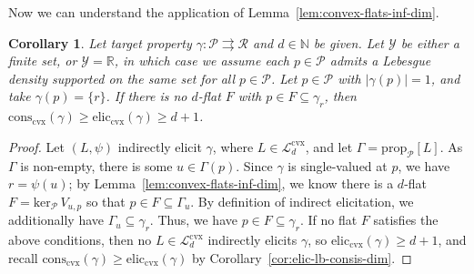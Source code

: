 \documentclass[11pt]{article} %
\newcommand{\Comments}{1}
\newcommand{\mynote}[2]{\ifnum\Comments=1\textcolor{#1}{#2}\fi}
\newcommand{\jessie}[1]{\mynote{purple}{[JF: #1]}}
\newcommand{\reals}{\mathbb{R}}
\newcommand{\simplex}{\Delta_\Y}
\newcommand{\relint}[1]{\mathrm{relint}(#1)}
\newcommand{\prop}[2][\mathcal{P}]{\mathrm{prop}_{#1}[#2]}
\newcommand{\eliccvx}{\mathrm{elic}_\mathrm{cvx}}
\newcommand{\conscvx}{\mathrm{cons}_\mathrm{cvx}}
\newcommand{\range}{\mathrm{range}\,}
\newcommand{\zeros}[1]{\mathrm{ker}_\P\,#1}
\newcommand{\Pcodimension}{$\mathcal{P}$-codimension\,}
\renewcommand{\L}{\mathcal{L}}
\newcommand{\Lcvx}{\mathcal{L}^{\mathrm{cvx}}}
\newcommand{\R}{\mathcal{R}}
\renewcommand{\P}{\mathcal{P}}
\newcommand{\Y}{\mathcal{Y}}
\newcommand{\toto}{\rightrightarrows}
\newtheorem{lemma}{Lemma}
\newtheorem{corollary}{Corollary}
\begin{document}
Now we can understand the application of Lemma~\ref{lem:convex-flats-inf-dim}.

\begin{corollary}\label{cor:Pcodim-flat-single-val-prop}
	Let target property $\gamma:\P \toto \R$ and $d\in\mathbb N$ be given.
	Let $\Y$ be either a finite set, or $\Y = \reals$, in which case we assume each $p\in\P$ admits a Lebesgue density supported on the same set for all $p\in\P$.
	Let $p \in \P$ with $|\gamma(p)| = 1$, and take $\gamma(p) = \{r\}$.
	If there is no $d$-flat $F$ with $p \in F \subseteq \gamma_r$, then $\conscvx(\gamma) \geq \eliccvx(\gamma) \geq d + 1$.%
\end{corollary}
\begin{proof}
	Let $(L, \psi)$ indirectly elicit $\gamma$, where $L\in\Lcvx_d$, and let $\Gamma = \prop{L}$.
	As $\Gamma$ is non-empty, there is some $u \in \Gamma(p)$.
	Since $\gamma$ is single-valued at $p$, we have $r = \psi(u)$; by Lemma~\ref{lem:convex-flats-inf-dim}, we know there is a $d$-flat $F = \zeros{V_{u,p}}$ so that $p \in F \subseteq \Gamma_u$.
	By definition of indirect elicitation, we additionally have $\Gamma_u \subseteq \gamma_r$.
	Thus, we have $p \in F \subseteq \gamma_r$.
	If no flat $F$ satisfies the above conditions, then no $L\in\Lcvx_d$ indirectly elicits $\gamma$, so $\eliccvx(\gamma) \geq d+1$, and recall $\conscvx(\gamma) \geq \eliccvx(\gamma)$ by Corollary~\ref{cor:elic-lb-consis-dim}.
\end{proof}



\end{document}
